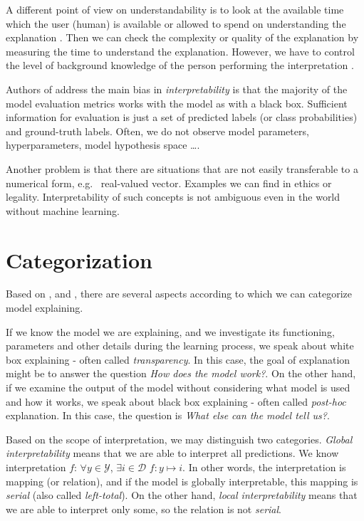 A different point of view on understandability is to look at the available time which the user (human) is available or allowed to spend on understanding the explanation \cite{Guidotti2018}. Then we can check the complexity or quality of the explanation by measuring the time to understand the explanation. However, we have to control the level of background knowledge of the person performing the interpretation \cite{Guidotti2018}.

Authors of \cite{Montavon2018} address the main bias in \emph{interpretability} is that the majority of the model evaluation metrics works with the model as with a black box. Sufficient information for evaluation is just a set of predicted labels (or class probabilities) and ground-truth labels. Often, we do not observe model parameters, hyperparameters, model hypothesis space \dots. 

Another problem is that there are situations that are not easily transferable to a numerical form, e.g. \ real-valued vector. Examples we can find in ethics or legality. Interpretability of such concepts is not ambiguous even in the world without machine learning.

\section{Categorization}
Based on \cite{Guidotti2018}, and \cite{Lipton2016}, there are several aspects according to which we can categorize model explaining.

If we know the model we are explaining, and we investigate its functioning, parameters and other details during the learning process, we speak about white box explaining - often called \emph{transparency}. In this case, the goal of explanation might be to answer the question \emph{How does the model work?}. On the other hand, if we examine the output of the model without considering what model is used and how it works, we speak about black box explaining - often called \emph{post-hoc} explanation. In this case, the question is \emph{What else can the model tell us?}.

Based on the scope of interpretation, we may distinguish two categories. \emph{Global interpretability} means that we are able to interpret all predictions. We know interpretation $f$: $\forall y \in \mathcal{Y}$, $\exists i \in \mathcal{D}$ $f: y\mapsto i$. In other words, the interpretation is mapping (or relation), and if the model is globally interpretable, this mapping is \emph{serial} (also called \emph{left-total}). On the other hand, \emph{local interpretability} means that we are able to interpret only some, so the relation is not \emph{serial}.

